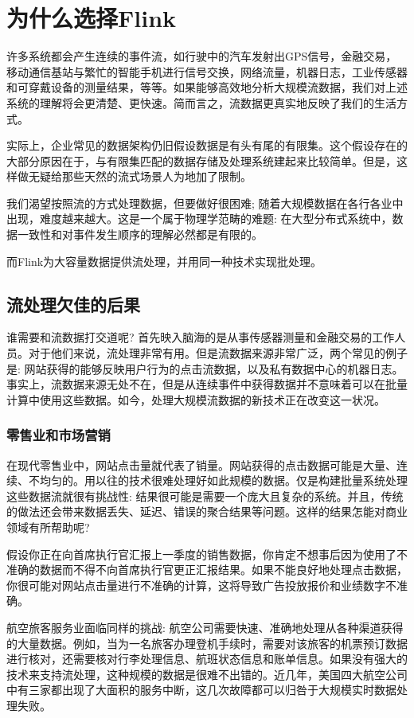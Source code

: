 \documentclass[oneside]{ctexbook}
\begin{document}
\section{为什么选择Flink}

许多系统都会产生连续的事件流，如行驶中的汽车发射出GPS信号，金融交易，移动通信基站与繁忙的智能手机进行信号交换，网络流量，机器日志，工业传感器和可穿戴设备的测量结果，等等。如果能够高效地分析大规模流数据，我们对上述系统的理解将会更清楚、更快速。简而言之，流数据更真实地反映了我们的生活方式。

实际上，企业常见的数据架构仍旧假设数据是有头有尾的有限集。这个假设存在的大部分原因在于，与有限集匹配的数据存储及处理系统建起来比较简单。但是，这样做无疑给那些天然的流式场景人为地加了限制。

我们渴望按照流的方式处理数据，但要做好很困难; 随着大规模数据在各行各业中出现，难度越来越大。这是一个属于物理学范畴的难题: 在大型分布式系统中，数据一致性和对事件发生顺序的理解必然都是有限的。

而Flink为大容量数据提供流处理，并用同一种技术实现批处理。

\subsection{流处理欠佳的后果}

谁需要和流数据打交道呢? 首先映入脑海的是从事传感器测量和金融交易的工作人员。对于他们来说，流处理非常有用。但是流数据来源非常广泛，两个常见的例子是: 网站获得的能够反映用户行为的点击流数据，以及私有数据中心的机器日志。事实上，流数据来源无处不在，但是从连续事件中获得数据并不意味着可以在批量计算中使用这些数据。如今，处理大规模流数据的新技术正在改变这一状况。

\subsubsection{零售业和市场营销}

在现代零售业中，网站点击量就代表了销量。网站获得的点击数据可能是大量、连续、不均匀的。用以往的技术很难处理好如此规模的数据。仅是构建批量系统处理这些数据流就很有挑战性: 结果很可能是需要一个庞大且复杂的系统。并且，传统的做法还会带来数据丢失、延迟、错误的聚合结果等问题。这样的结果怎能对商业领域有所帮助呢?

假设你正在向首席执行官汇报上一季度的销售数据，你肯定不想事后因为使用了不准确的数据而不得不向首席执行官更正汇报结果。如果不能良好地处理点击数据，你很可能对网站点击量进行不准确的计算，这将导致广告投放报价和业绩数字不准确。

航空旅客服务业面临同样的挑战: 航空公司需要快速、准确地处理从各种渠道获得的大量数据。例如，当为一名旅客办理登机手续时，需要对该旅客的机票预订数据进行核对，还需要核对行李处理信息、航班状态信息和账单信息。如果没有强大的技术来支持流处理，这种规模的数据是很难不出错的。近几年，美国四大航空公司中有三家都出现了大面积的服务中断，这几次故障都可以归咎于大规模实时数据处理失败。
\end{document}
